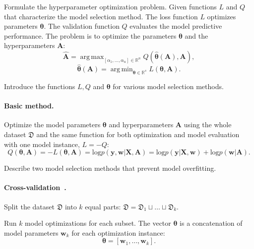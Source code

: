 \documentclass[smallcondensed]{svjour3}
\DeclareMathOperator*{\argmin}{arg\,min}
\DeclareMathOperator*{\argmax}{arg\,max}
\begin{document}
   


Formulate the hyperparameter optimization problem. Given functions $L$ and $Q$ that characterize the model selection method. The loss function $L$ optimizes parameters $\boldsymbol{\theta}$. The validation function $Q$ evaluates the model predictive performance.
The problem is to optimize the parameters $\boldsymbol{\theta}$ and the hyperparameters $\mathbf{A}$: 
\begin{equation}
\label{eq:main}
	\hat{\mathbf{A}} = \argmax_{[\alpha_1, \dots, \alpha_u] \in \mathbb{R}^n} Q(\hat{\boldsymbol{\theta}}(\mathbf{A}), \mathbf{A}),
\end{equation}
\begin{equation}
\label{eq:main2}
	\hat{\boldsymbol{\theta}}(\mathbf{A}) =  \argmin_{\boldsymbol{\theta} \in \mathbb{R}^s} L(\boldsymbol{\theta}, \mathbf{A}).
\end{equation}

Introduce the functions $L, Q$ and $\boldsymbol{\theta}$ for various model selection methods.

\paragraph{Basic method.}
Optimize the model parameters $\boldsymbol{\theta}$ and hyperparameters $\mathbf{A}$ using the whole dataset $\mathfrak{D}$ and the same function for both optimization and model evaluation with one model instance, $L = -Q$:
\begin{equation} 
\label{eq:basic}
Q(\boldsymbol{\theta}, \mathbf{A}) = -L(\boldsymbol{\theta}, \mathbf{A})  = \text{log}p(\mathbf{y}, \mathbf{w} | \mathbf{X}, \mathbf{A}) = \text{log} p(\mathbf{y}|\mathbf{X}, \mathbf{w})+\text{log}p(\mathbf{w}|\mathbf{A}).
\end{equation}

Describe two model selection methods that prevent model overfitting.

\paragraph{Cross-validation~\cite{cv_ms}.}
Split the dataset  $\mathfrak{D}$ into $k$ equal parts:
$
\mathfrak{D} = \mathfrak{D}_1 \sqcup \dots \sqcup \mathfrak{D}_k.
$


Run $k$ model optimizations for each subset. The vector $\boldsymbol{\theta}$ is a concatenation of model parameters $\mathbf{w}_k$ for each optimization instance:
\[
\boldsymbol{\theta} = [\mathbf{w}_1, \dots, \mathbf{w}_k].
\]
 
\end{document}
